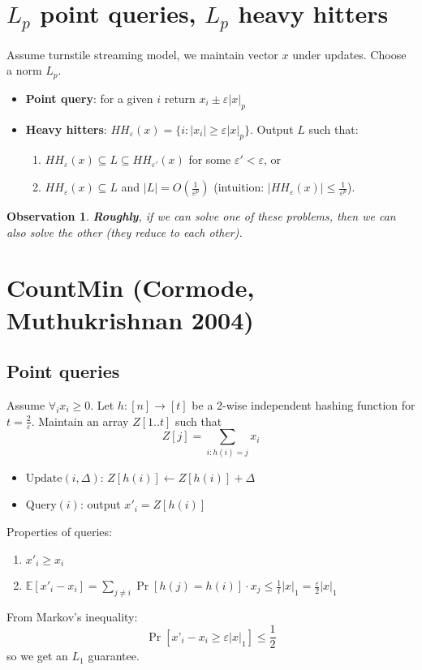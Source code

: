 \documentclass[11pt]{article}
\newtheorem{observation}[theorem]{Observation}
\newcommand{\E}{{\mathbb E}}
\begin{document}
\section{$L_p$ point queries, $L_p$ heavy hitters}
Assume turnstile streaming model, we maintain vector $x$ under updates. Choose a norm $L_p$.
\begin{itemize}
\item \textbf{Point query}: for a given $i$ return $x_i \pm \varepsilon |x|_p$
\item \textbf{Heavy hitters}: $HH_\varepsilon(x) = \{ i: |x_i| \ge \varepsilon |x|_p\}$. Output $L$ such that:
\begin{enumerate}
\item $HH_\varepsilon(x) \subseteq L \subseteq HH_{\varepsilon'}(x)$ for some $\varepsilon' < \varepsilon$, or
\item $HH_\varepsilon(x) \subseteq L$ and $|L| = O(\frac{1}{\varepsilon^p})$ (intuition: $|HH_\varepsilon(x)| \le \frac{1}{\varepsilon^p}$).
\end{enumerate}
\end{itemize}
\begin{observation}
\textbf{Roughly}, if we can solve one of these problems, then we can also solve the other (they reduce to each other).
\end{observation}
\section{CountMin (Cormode, Muthukrishnan 2004)}
\subsection{Point queries}
Assume $\forall_i x_i \ge 0$. Let $h:[n]\to[t]$ be a 2-wise independent hashing function for $t=\frac{2}{\varepsilon}$. Maintain an array $Z[1..t]$ such that $$Z[j]=\sum_{i: h(i) = j} x_i$$
\begin{itemize}
\item $\text{Update}(i, \Delta)$: $Z[h(i)] \leftarrow Z[h(i)] + \Delta$
\item $\text{Query}(i)$: output $x'_i = Z[h(i)]$
\end{itemize}
Properties of queries:
\begin{enumerate}
\item $x'_i \ge x_i$
\item $\E[x'_i - x_i] = \sum_{j \neq i} \Pr[h(j) = h(i)] \cdot x_j \le \frac{1}{t}|x|_1 = \frac{\varepsilon}{2}|x|_1$
\end{enumerate}
From Markov's inequality: $$\Pr[x’_i - x_i \ge \varepsilon |x|_1] \le \frac{1}{2}$$
so we get an $L_1$ guarantee.
\end{document}
